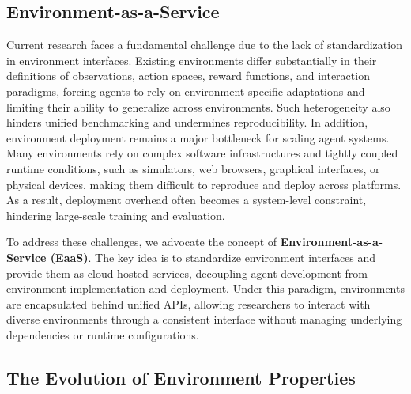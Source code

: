 \documentclass{llmxive}
\begin{document}
\subsection{Environment-as-a-Service}


Current research faces a fundamental challenge due to the lack of standardization in environment interfaces. 
Existing environments differ substantially in their definitions of observations, action spaces, reward functions, and interaction paradigms, forcing agents to rely on environment-specific adaptations and limiting their ability to generalize across environments. 
Such heterogeneity also hinders unified benchmarking and undermines reproducibility.
In addition, environment deployment remains a major bottleneck for scaling agent systems.
Many environments rely on complex software infrastructures and tightly coupled runtime conditions, such as simulators, web browsers, graphical interfaces, or physical devices, making them difficult to reproduce and deploy across platforms. 
As a result, deployment overhead often becomes a system-level constraint, hindering large-scale training and evaluation.

To address these challenges, we advocate the concept of \textbf{Environment-as-a-Service (EaaS)}. The key idea is to standardize environment interfaces and provide them as cloud-hosted services, decoupling agent development from environment implementation and deployment. Under this paradigm, environments are encapsulated behind unified APIs, allowing researchers to interact with diverse environments through a consistent interface without managing underlying dependencies or runtime configurations.


\subsection{The Evolution of Environment Properties}
\end{document}
